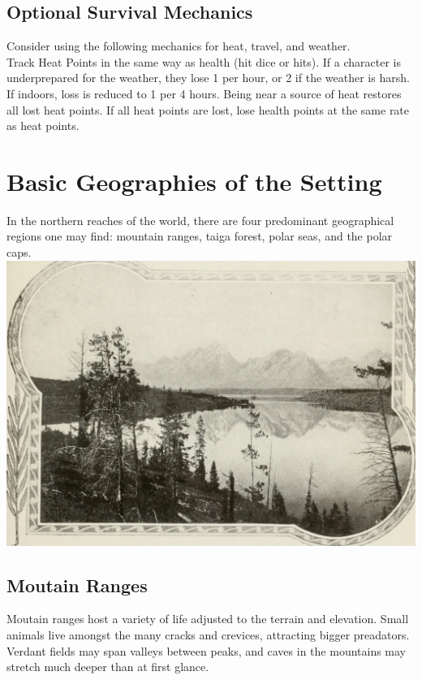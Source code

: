 \documentclass[notitlepage]{article}
\begin{document}
\begin{multicols}{2}
\subsection*{Optional Survival Mechanics}

Consider using the following mechanics for heat, travel, and weather. \\

Track Heat Points in the same way as health (hit dice or hits).
If a character is underprepared for the weather, they lose 1 per hour, or 2 if the weather is harsh.
If indoors, loss is reduced to 1 per 4 hours.
Being near a source of heat restores all lost heat points.
If all heat points are lost, lose health points at the same rate as heat points.


\section{Basic Geographies of the Setting}

In the northern reaches of the world, there are four predominant geographical regions one may find: mountain ranges, taiga forest, polar seas, and the polar caps. \\

{\centering
\includegraphics[width=\columnwidth]{geography-mountains}
}
\subsection*{Moutain Ranges}

Moutain ranges host a variety of life adjusted to the terrain and elevation. Small animals live amongst the many cracks and crevices, attracting bigger preadators. Verdant fields may span valleys between peaks, and caves in the mountains may stretch much deeper than at first glance. \\


\end{multicols}
\end{document}
